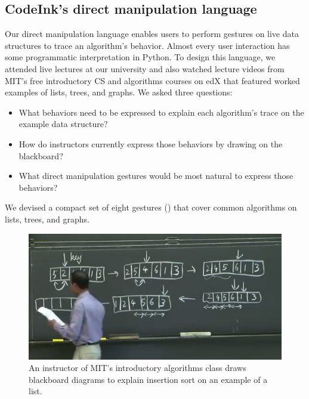 \subsection{CodeInk's direct manipulation language}

Our direct manipulation language enables users to perform gestures on live data
structures to trace an algorithm's behavior. Almost every user interaction
has some programmatic interpretation in Python.
To design this language, we attended live lectures at our university and
also watched lecture videos from MIT's
free introductory CS and algorithms courses on edX that featured worked examples of
lists, trees, and graphs. We asked three questions:

\begin{itemize}

  \item What behaviors need to be expressed to explain each algorithm's
  trace on the example data structure?

  \item How do instructors currently express those behaviors by drawing
  on the blackboard?

  \item What direct manipulation gestures would be most natural to
  express those behaviors?

\end{itemize}

We devised a compact set of eight gestures ()
that cover common algorithms on lists, trees, and graphs.



\begin{figure}

\begin{center}
\includegraphics[width=0.7\columnwidth]{img/6006/insertion.png}
\end{center}

\caption{An instructor of MIT's introductory algorithms class draws
blackboard diagrams to explain insertion sort on an example of a list.}
\label{fig:6006-insertion}
\end{figure}


